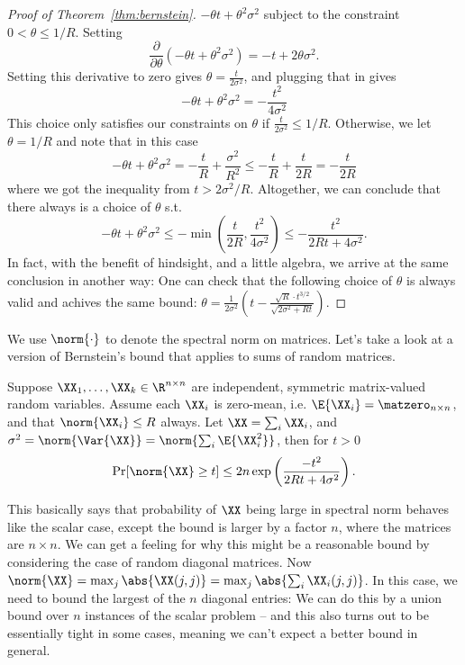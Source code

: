 \begin{proof}[Proof of Theorem~\ref{thm:bernstein}]
$-\theta t + \theta^2 \sigma^2$ subject to the constraint
$0< \theta \leq 1/R$.
Setting
\[ \frac{\partial}{\partial \theta}\left(
    -\theta t + \theta^2
    \sigma^2
  \right)
  = - t + 2 \theta \sigma^2
  .
\]
Setting this derivative to zero gives
$\theta = \frac{t}{2\sigma^2}$,
and plugging that in gives
\[
    -\theta t + \theta^2\sigma^2
    =
    -\frac{t^2}{4\sigma^2}
  \]
This choice only satisfies our constraints on $\theta$ if
$\frac{t}{2\sigma^2} \leq 1/R$.
Otherwise, we let $\theta =  1/R$ and note that in this case
\[
    -\theta t + \theta^2\sigma^2
    =
    -\frac{t}{R} + \frac{\sigma^2}{R^2}
    \leq
    -\frac{t}{R} + \frac{t}{2R}
    =
    -\frac{t}{2R}
  \]
  where we got the inequality from $t > 2\sigma^2/R$.
  Altogether, we can conclude that there always is a choice of
  $\theta$ s.t.
  \[
    -\theta t + \theta^2\sigma^2
    \leq
    - \min\left( \frac{t}{2R} , \frac{t^2}{4\sigma^2} \right)
    \leq
    - \frac{t^2}{2Rt + 4\sigma^2}
    .
  \]
  In fact, with the benefit of hindsight, and a little algebra, we
  arrive at the same conclusion in another way:
  One
  can check that the
  following choice of $\theta$ is always valid and achives the same
  bound:
  $\theta = \frac{1}{2
    \sigma^2}\left( t - \frac{\sqrt{R} \cdot t^{3/2}}{\sqrt{2\sigma^2 + R
        t}} \right)$.
\end{proof}
We use $\norm{\cdot}$ to denote the spectral norm on matrices.
Let's take a look at a version of Bernstein's bound that applies to
sums of random matrices.
\begin{theorem}
  \label{thm:matbernstein}
  Suppose $\XX_1, \ldots, \XX_k \in \R^{n \times n}$ are independent,
  symmetric matrix-valued
  random variables.
Assume each $\XX_i$ is zero-mean, i.e. $\E{\XX_i} = \matzero_{n \times
  n}$, and that $\norm{\XX_i} \leq R$ always.
Let $\XX = \sum_i \XX_i$, and $\sigma^2 = \norm{\Var{\XX}} = \norm{\sum_i \E{\XX_i^2}}$,
then for $t > 0$
\[
\Pr[ \norm{\XX} \geq t] \leq 2n\exp\left(\frac{-t^2}{2Rt + 4\sigma^2}\right)
.
\]
\end{theorem}
This basically says that probability of $\XX$ being large in spectral
norm behaves like the scalar case, except the bound is larger by a factor
$n$, where the matrices are $n \times n$.
We can get a feeling for why this might be a reasonable bound by
considering the case of random diagonal matrices.
Now $\norm{\XX} = \max_j \abs{\XX (j,j)} = \max_j \abs{\sum_i
  \XX_i(j,j)}$.
In this case, we need to bound the largest of the $n$ diagonal
entries: We can do this by a union bound over $n$ instances of the
scalar problem -- and this also turns out to be essentially tight in some cases,
meaning we can't expect a better bound in general.

